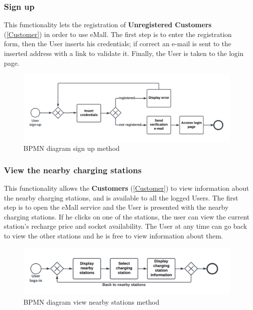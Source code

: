\subsubsection{Sign up}
This functionality lets the registration of \textbf{Unregistered Customers} (\ref{Customer}) in order to use eMall. The first step is to enter the registration form, then the User inserts his credentials; if correct an e-mail is sent to the inserted address with a link to validate it. 
Finally, the User is taken to the login page.
\begin{figure}[H]
    \begin{center}
        \includegraphics[width=\textwidth]{img/fun-sign-up.png}
        \caption{BPMN diagram sign up method}
    \end{center}
\end{figure}
\subsubsection{View the nearby charging stations}
This functionality allows the \textbf{Customers} (\ref{Customer}) to view information about the nearby charging stations, and is available to all  the logged Users. 
The first step is to open the eMall service and the User is presented with the nearby charging stations. 
If he clicks on one of the stations, the user can view the current station's recharge price and socket availability.
The User at any time can go back to view the other stations and he is free to view information about them.\label{View}
\begin{figure}[H]
    \begin{center}
        \includegraphics[width=\textwidth]{img/fun-view-info.png}
        \caption{BPMN diagram view nearby stations method}
    \end{center}
\end{figure}
